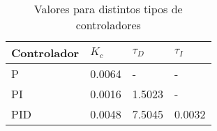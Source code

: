 \begin{table}[H]
    \caption{Valores para distintos tipos de controladores}
    \label{valore_controladores}
   \centering
   \begin{tabular}{llll}
   \hline
   Controlador & $K_c$ & $\tau_D$ & $\tau_I$  \\
   \hline
   P                   & 0.0064    & -   &-     \\
   PI                  &  0.0016  & 1.5023    & -    \\
   PID                 & 0.0048 & 7.5045   &0.0032   \\
   \hline
   \end{tabular}
\end{table}
   